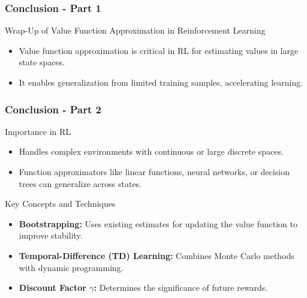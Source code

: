\documentclass[aspectratio=169]{beamer}
\begin{document}
\begin{frame}[fragile]
    \frametitle{Conclusion - Part 1}
    \begin{block}{Wrap-Up of Value Function Approximation in Reinforcement Learning}
        \begin{itemize}
            \item Value function approximation is critical in RL for estimating values in large state spaces.
            \item It enables generalization from limited training samples, accelerating learning.
        \end{itemize}
    \end{block}
\end{frame}

\begin{frame}[fragile]
    \frametitle{Conclusion - Part 2}
    \begin{block}{Importance in RL}
        \begin{itemize}
            \item Handles complex environments with continuous or large discrete spaces.
            \item Function approximators like linear functions, neural networks, or decision trees can generalize across states.
        \end{itemize}
    \end{block}
    
    \begin{block}{Key Concepts and Techniques}
        \begin{itemize}
            \item \textbf{Bootstrapping:} Uses existing estimates for updating the value function to improve stability.
            \item \textbf{Temporal-Difference (TD) Learning:} Combines Monte Carlo methods with dynamic programming.
            \item \textbf{Discount Factor $\gamma$:} Determines the significance of future rewards.
        \end{itemize}
    \end{block}
\end{frame}
\end{document}
